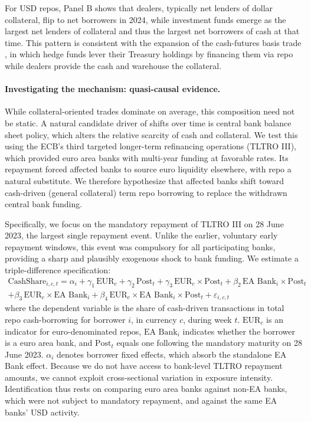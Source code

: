 \documentclass[english, 12pt, oneside]{article}
\begin{document}
For USD repos, Panel B shows that dealers, typically net lenders of dollar collateral, flip to net borrowers in 2024, while investment funds emerge as the largest net lenders of collateral and thus the largest net borrowers of cash at that time. This pattern is consistent with the expansion of the cash-futures basis trade \citep{barth2025, kashyap2025, kruttli2025ltcm}, in which hedge funds lever their Treasury holdings by financing them via repo while dealers provide the cash and warehouse the collateral.

\paragraph{Investigating the mechanism: quasi-causal evidence.}
While collateral-oriented trades dominate on average, this composition need not be static. A natural candidate driver of shifts over time is central bank balance sheet policy, which alters the relative scarcity of cash and collateral. We test this using the ECB's third targeted longer-term refinancing operations (TLTRO III), which provided euro area banks with multi-year funding at favorable rates. Its repayment forced affected banks to source euro liquidity elsewhere, with repo a natural substitute. We therefore hypothesize that affected banks shift toward cash-driven (general collateral) term repo borrowing to replace the withdrawn central bank funding.

Specifically, we focus on the mandatory repayment of TLTRO III on 28 June 2023, the largest single repayment event. Unlike the earlier, voluntary early repayment windows, this event was compulsory for all participating banks, providing a sharp and plausibly exogenous shock to bank funding. We estimate a triple-difference specification:
\begin{multline}
\label{eq:tltro_dynamic}
\text{CashShare}_{i,c,t} = \alpha_i + \gamma_1 \, \text{EUR}_c + \gamma_2 \, \text{Post}_t + \gamma_3 \, \text{EUR}_c \times \text{Post}_t + \beta_2 \, \text{EA Bank}_i \times \text{Post}_t \\
+ \beta_3 \, \text{EUR}_c \times \text{EA Bank}_i + \beta_4 \, \text{EUR}_c \times \text{EA Bank}_i \times \text{Post}_t + \varepsilon_{i,c,t}
\end{multline}
where the dependent variable is the share of cash-driven transactions in total repo cash-borrowing for borrower $i$, in currency $c$, during week $t$. $\text{EUR}_c$ is an indicator for euro-denominated repos, $\text{EA Bank}_i$ indicates whether the borrower is a euro area bank, and $\text{Post}_t$ equals one following the mandatory maturity on 28 June 2023. $\alpha_i$ denotes borrower fixed effects, which absorb the standalone EA Bank effect. Because we do not have access to bank-level TLTRO repayment amounts, we cannot exploit cross-sectional variation in exposure intensity. Identification thus rests on comparing euro area banks against non-EA banks, which were not subject to mandatory repayment, and against the same EA banks' USD activity. 
\end{document}
